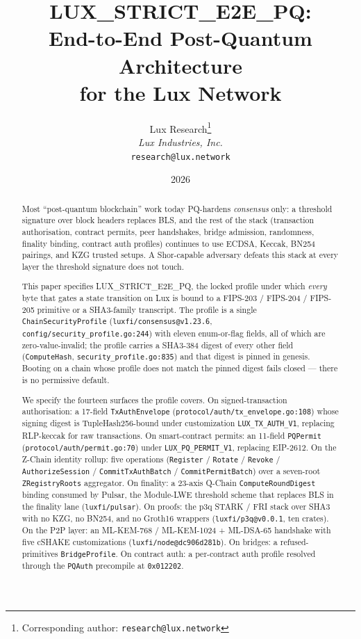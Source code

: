 \documentclass[11pt,a4paper]{article}
\title{LUX\_STRICT\_E2E\_PQ:\\
End-to-End Post-Quantum Architecture\\
for the Lux Network}
\author{
Lux Research\thanks{Corresponding author: \texttt{research@lux.network}}\\
\textit{Lux Industries, Inc.}\\
\texttt{research@lux.network}
}
\date{2026}
\begin{document}
\luxcoverpage

\begin{abstract}
Most ``post-quantum blockchain'' work today PQ-hardens \emph{consensus} only: a
threshold signature over block headers replaces BLS, and the rest of the stack
(transaction authorisation, contract permits, peer handshakes, bridge admission,
randomness, finality binding, contract auth profiles) continues to use ECDSA,
Keccak, BN254 pairings, and KZG trusted setups. A Shor-capable adversary
defeats this stack at every layer the threshold signature does not touch.

This paper specifies LUX\_STRICT\_E2E\_PQ, the locked profile under which
\emph{every} byte that gates a state transition on Lux is bound to a FIPS-203 /
FIPS-204 / FIPS-205 primitive or a SHA3-family transcript. The profile is a
single \texttt{ChainSecurityProfile} (\texttt{luxfi/consensus@v1.23.6},
\texttt{config/security\_profile.go:244}) with eleven enum-or-flag fields, all
of which are zero-value-invalid; the profile carries a SHA3-384 digest of every
other field (\texttt{ComputeHash}, \texttt{security\_profile.go:835}) and that
digest is pinned in genesis. Booting on a chain whose profile does not match
the pinned digest fails closed --- there is no permissive default.

We specify the fourteen surfaces the profile covers. On signed-transaction
authorisation: a 17-field \texttt{TxAuthEnvelope}
(\texttt{protocol/auth/tx\_envelope.go:108}) whose signing digest is
TupleHash256-bound under customization \texttt{LUX\_TX\_AUTH\_V1}, replacing
RLP-keccak for raw transactions. On smart-contract permits: an 11-field
\texttt{PQPermit} (\texttt{protocol/auth/permit.go:70}) under
\texttt{LUX\_PQ\_PERMIT\_V1}, replacing EIP-2612. On the Z-Chain identity
rollup: five operations (\texttt{Register} / \texttt{Rotate} / \texttt{Revoke} /
\texttt{AuthorizeSession} / \texttt{CommitTxAuthBatch} /
\texttt{CommitPermitBatch}) over a seven-root \texttt{ZRegistryRoots}
aggregator. On finality: a 23-axis Q-Chain \texttt{ComputeRoundDigest} binding
consumed by Pulsar, the Module-LWE threshold scheme that replaces BLS in the
finality lane (\texttt{luxfi/pulsar}). On proofs: the p3q STARK / FRI
stack over SHA3 with no KZG, no BN254, and no Groth16 wrappers
(\texttt{luxfi/p3q@v0.0.1}, ten crates). On the P2P layer: an ML-KEM-768 /
ML-KEM-1024 + ML-DSA-65 handshake with five cSHAKE customizations
(\texttt{luxfi/node@dc906d281b}). On bridges: a refused-primitives
\texttt{BridgeProfile}. On contract auth: a per-contract auth profile resolved
through the \texttt{PQAuth} precompile at \texttt{0x012202}.


\end{abstract}
\end{document}
